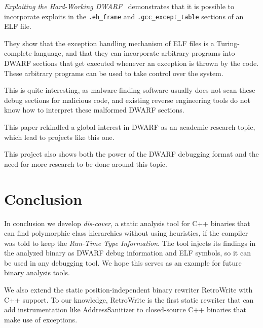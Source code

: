 \documentclass[a4paper,11pt,oneside]{report}
\begin{document}
\emph{Exploiting the Hard-Working DWARF}~\cite{hardworkingdwarf}
demonstrates that it is possible to incorporate exploits in the
\texttt{.eh\_frame} and \texttt{.gcc\_except\_table} sections of an ELF file.

They show that the exception handling mechanism of ELF files is a
Turing-complete language, and that they can incorporate arbitrary programs
into DWARF sections that get executed whenever an exception is thrown by the
code.
These arbitrary programs can be used to take control over the system.

This is quite interesting, as malware-finding software usually does not scan
these debug sections for malicious code, and existing reverse engineering
tools do not know how to interpret these malformed DWARF sections.

This paper rekindled a global interest in DWARF as an academic research topic,
which lead to projects like this one.

This project also shows both the power of the DWARF debugging format and the
need for more research to be done around this topic.

\chapter{Conclusion}


In conclusion we develop \emph{dis-cover}, a static analysis tool for C++
binaries that can find polymorphic class hierarchies without using heuristics,
if the compiler was told to keep the \emph{Run-Time Type Information}.
The tool injects its findings in the analyzed binary as DWARF debug
information and ELF symbols, so it can be used in any debugging tool.
We hope this serves as an example for future binary analysis tools.

We also extend the static position-independent binary rewriter RetroWrite with
C++ support.
To our knowledge, RetroWrite is the first static rewriter that can add
instrumentation like AddressSanitizer to closed-source C++ binaries that make
use of exceptions.

\cleardoublepage
{}
{}
\printbibliography

%
%
\end{document}
